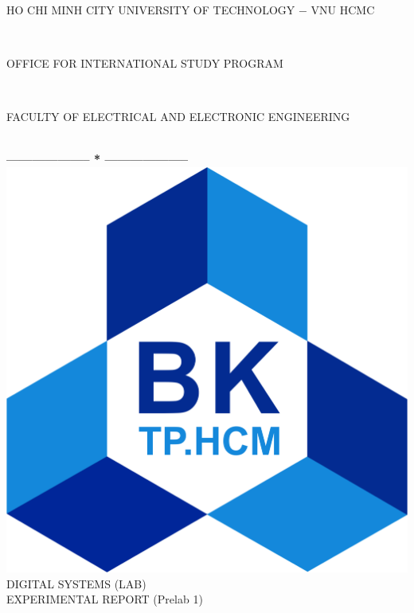 \documentclass[13pt,a4paper]{report}
\begin{document}
\fontsize{13pt}{18pt}\selectfont
\begin{titlepage}
\thispagestyle{empty}
\thisfancypage{%
\setlength{\fboxsep}{0pt}%
\fbox}{} %
\

\begin{center}
\begin{large}
HO CHI MINH CITY UNIVERSITY OF TECHNOLOGY $-$ VNU HCMC
\end{large} \\
\begin{large}
OFFICE FOR INTERNATIONAL STUDY PROGRAM
\end{large} \\
\begin{large}
FACULTY OF ELECTRICAL AND ELECTRONIC ENGINEERING
\end{large} \\
\textbf{--------------------  *  --------------------}\\[4cm]
\includegraphics[scale=0.1]{logobk.png}\\[1cm]
{\fontsize{20pt}{1}\selectfont DIGITAL SYSTEMS (LAB)}\\
{\fontsize{20pt}{1}\selectfont EXPERIMENTAL REPORT (Prelab 1)}\\[2.5cm]
\end{center}


\end{titlepage}
\end{document}
